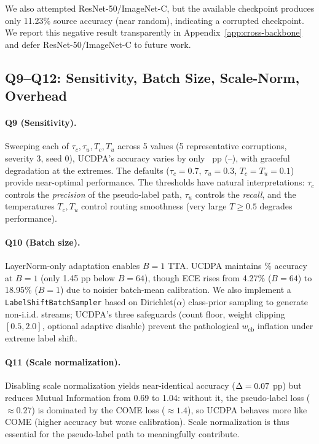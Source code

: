We also attempted ResNet-50/ImageNet-C, but the available checkpoint produces only 11.23\% source accuracy (near random), indicating a corrupted checkpoint. We report this negative result transparently in Appendix~\ref{app:cross-backbone} and defer ResNet-50/ImageNet-C to future work.

\subsection{Q9--Q12: Sensitivity, Batch Size, Scale-Norm, Overhead}
\label{sec:exp:q9-q12}





\paragraph{Q9 (Sensitivity).}
Sweeping each of $\tau_c, \tau_u, T_c, T_u$ across 5 values (5 representative corruptions, severity 3, seed 0), UCDPA's accuracy varies by only \sensRange{}~pp (\sensRangeLow{}--\sensRangeHigh{}), with graceful degradation at the extremes. The defaults ($\tau_c=0.7$, $\tau_u=0.3$, $T_c=T_u=0.1$) provide near-optimal performance. The thresholds have natural interpretations: $\tau_c$ controls the \emph{precision} of the pseudo-label path, $\tau_u$ controls the \emph{recall}, and the temperatures $T_c, T_u$ control routing smoothness (very large $T \ge 0.5$ degrades performance).

\paragraph{Q10 (Batch size).}
LayerNorm-only adaptation enables $B=1$ TTA. UCDPA maintains \bsOne\% accuracy at $B=1$ (only 1.45 pp below $B=64$), though ECE rises from 4.27\% ($B=64$) to 18.95\% ($B=1$) due to noisier batch-mean calibration. We also implement a \texttt{LabelShiftBatchSampler} based on Dirichlet($\alpha$) class-prior sampling to generate non-i.i.d. streams; UCDPA's three safeguards (count floor, weight clipping $[0.5, 2.0]$, optional adaptive disable) prevent the pathological $w_{\mathrm{cb}}$ inflation under extreme label shift.

\paragraph{Q11 (Scale normalization).}
Disabling scale normalization yields near-identical accuracy ($\Delta=0.07{}$ pp) but reduces Mutual Information from 0.69 to 1.04: without it, the pseudo-label loss ($\approx 0.27$) is dominated by the COME loss ($\approx 1.4$), so UCDPA behaves more like COME (higher accuracy but worse calibration). Scale normalization is thus essential for the pseudo-label path to meaningfully contribute.

